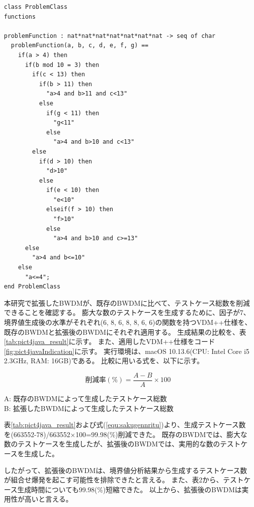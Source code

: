 \documentclass[uplatex, report, a4j, 10pt]{jsbook}
\begin{document}
\lstset{language=}
\noindent\begin{minipage}{\textwidth}
  \begin{lstlisting}[caption={因子が7、水準が$(6, 8, 6, 8, 8, 6, 6)$の関数を持つVDM++仕様},label=fig:pict4javaIndication]
class ProblemClass
functions

problemFunction : nat*nat*nat*nat*nat*nat*nat -> seq of char
  problemFunction(a, b, c, d, e, f, g) ==
    if(a > 4) then
      if(b mod 10 = 3) then
        if(c < 13) then
          if(b > 11) then
            "a>4 and b>11 and c<13"
          else
            if(g < 11) then
              "g<11"
            else
              "a>4 and b>10 and c<13"
        else
          if(d > 10) then
            "d>10"
          else
            if(e < 10) then
              "e<10"
            elseif(f > 10) then
              "f>10"
            else
              "a>4 and b>10 and c>=13"
      else
        "a>4 and b<=10"
    else
      "a<=4";
end ProblemClass
\end{lstlisting}
\end{minipage}

本研究で拡張したBWDMが、既存のBWDMに比べて、テストケース総数を削減できることを確認する。
膨大な数のテストケースを生成するために、因子が7、境界値生成後の水準がそれぞれ(6, 8, 6, 8, 8, 6, 6)の関数を持つVDM++仕様を、既存のBWDMと拡張後のBWDMにそれぞれ適用する。
生成結果の比較を、表\ref{tab:pict4java_result}に示す。
また、適用したVDM++仕様をコード\ref{fig:pict4javaIndication}に示す。
実行環境は、macOS 10.13.6(CPU: Intel Core i5 2.3GHz, RAM: 16GB)である。
比較に用いる式を、以下に示す。

\begin{equation}\label{equ:sakugennritu}
  削減率(\%) = \frac{A - B}{A} \times 100
\end{equation}

\begin{center}
  A: 既存のBWDMによって生成したテストケース総数\\
  B: 拡張したBWDMによって生成したテストケース総数\\
\end{center}

表\ref{tab:pict4java_result}および式(\ref{equ:sakugennritu})より、生成テストケース数を(663552-78)/663552×100=99.98(\%)削減できた。
既存のBWDMでは、膨大な数のテストケースを生成したが、拡張後のBWDMでは、実用的な数のテストケースを生成した。

したがって、拡張後のBWDMは、境界値分析結果から生成するテストケース数が組合せ爆発を起こす可能性を排除できたと言える。
また、表2から、テストケース生成時間についても99.98(\%)短縮できた。
以上から、拡張後のBWDMは実用性が高いと言える。
\end{document}
